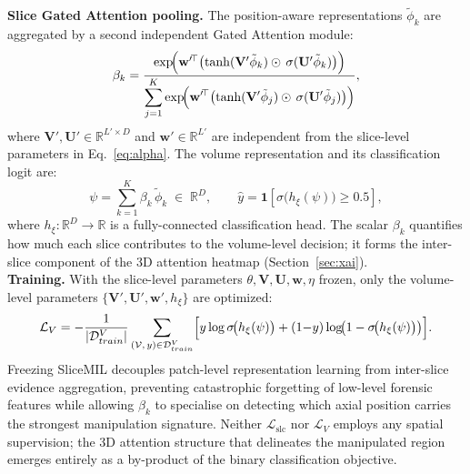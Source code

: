 \documentclass[sigconf, screen, review, anonymous]{acmart}
\begin{document}
\smallskip
\noindent\textbf{Slice Gated Attention pooling.}
The position-aware representations $\tilde{\phi}_k$ are aggregated by a second independent Gated Attention module:
%
\begin{equation}
    \beta_k = \frac{
        \exp\!\Bigl(\mathbf{w}'^{\!\top}
            \bigl(\tanh(\mathbf{V}' \tilde{\phi}_k)
            \odot\, \sigma(\mathbf{U}' \tilde{\phi}_k)\bigr)\Bigr)
    }{
        \displaystyle\sum_{j=1}^{K}
        \exp\!\Bigl(\mathbf{w}'^{\!\top}
            \bigl(\tanh(\mathbf{V}' \tilde{\phi}_j)
            \odot\, \sigma(\mathbf{U}' \tilde{\phi}_j)\bigr)\Bigr)
    },
    \label{eq:beta}
\end{equation}
%
where $\mathbf{V}', \mathbf{U}' \in \mathbb{R}^{L' \times D}$ and $\mathbf{w}' \in \mathbb{R}^{L'}$ are independent from the slice-level parameters in Eq.~\eqref{eq:alpha}.
The volume representation and its classification logit are:
%
\begin{equation}
    \psi = \sum_{k=1}^{K} \beta_k\, \tilde{\phi}_k \;\in\; \mathbb{R}^{D},
    \qquad
    \hat{y} = \mathbf{1}\!\left[\sigma\!\bigl(h_\xi(\psi)\bigr) \geq 0.5\right],
    \label{eq:vol_rep}
\end{equation}
%
where $h_\xi \colon \mathbb{R}^{D} \to \mathbb{R}$ is a fully-connected classification head. The scalar $\beta_k$ quantifies how much each slice contributes to the volume-level decision; it forms the inter-slice component of the 3D attention heatmap (Section~\ref{sec:xai}).\\
%
\smallskip
\noindent\textbf{Training.}
With the slice-level parameters $\theta, \mathbf{V}, \mathbf{U}, \mathbf{w}, \eta$ frozen, only the volume-level parameters $\{\mathbf{V}', \mathbf{U}', \mathbf{w}', h_\xi\}$ are optimized:
%
\begin{equation}
\small
    \mathcal{L}_V = -\frac{1}{|\mathcal{D}^V_{train}|}
    \sum_{(\mathcal{V},\, y) \in \mathcal{D}^V_{train}}
    \Bigl[
        y \log \sigma\!\bigl(h_\xi(\psi)\bigr)
        + (1{-}y)\log\!\bigl(1 - \sigma\!\bigl(h_\xi(\psi)\bigr)\bigr)
    \Bigr].
    \label{eq:loss_vol}
\end{equation}
%
Freezing SliceMIL decouples patch-level representation learning from inter-slice evidence aggregation, preventing catastrophic forgetting of low-level forensic features while allowing $\beta_k$ to specialise on detecting which axial position carries the strongest manipulation signature. Neither $\mathcal{L}_{\mathrm{slc}}$ nor $\mathcal{L}_V$ employs any spatial supervision; the 3D attention structure that delineates the manipulated region emerges entirely as a by-product of the binary classification objective.
\end{document}
